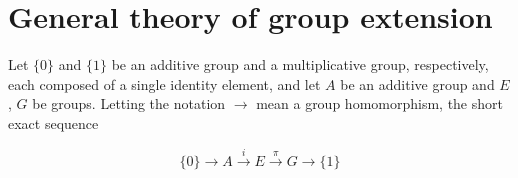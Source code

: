 \documentclass[12pt]{iopart}
\newcommand{\xrightarrowi}{\stackrel{{\ i\ }}{\longrightarrow}}
\newcommand{\xrightarrowpi}{\stackrel{\pi}{\longrightarrow}}
\begin{document}
%
%
%
%
%
%
%


\section{General theory of group extension}

Let \(\{0\}\) and \(\{1\}\) be an additive group and a multiplicative group, respectively, each composed of a single identity element,
and let \(A\) be an additive group and \(E\), \(G\) be groups.
Letting the notation \(\longrightarrow\) mean a group homomorphism,
the short exact sequence


\begin{equation}
\{0\}\longrightarrow A\xrightarrowi E\xrightarrowpi G\longrightarrow\{1\}
\end{equation}

\end{document}
